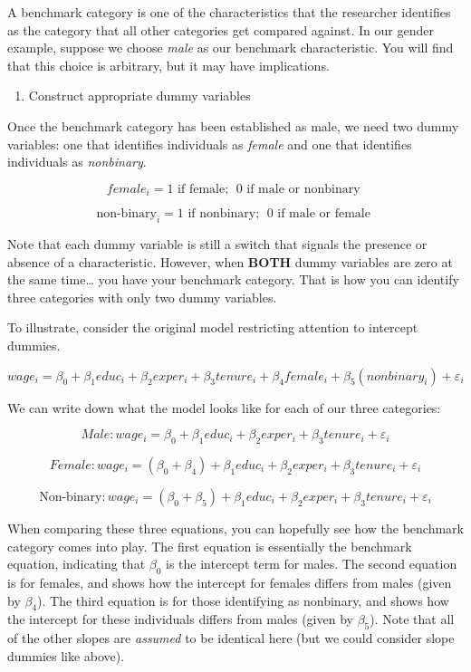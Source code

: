 \documentclass[
]{book}
\providecommand{\tightlist}{%
  \setlength{\itemsep}{0pt}\setlength{\parskip}{0pt}}
\begin{document}
A benchmark category is one of the characteristics that the researcher identifies as the category that all other categories get compared against. In our gender example, suppose we choose \emph{male} as our benchmark characteristic. You will find that this choice is arbitrary, but it may have implications.

\begin{enumerate}
\def\labelenumi{\arabic{enumi}.}
\setcounter{enumi}{1}
\tightlist
\item
  Construct appropriate dummy variables
\end{enumerate}

Once the benchmark category has been established as male, we need two dummy variables: one that identifies individuals as \emph{female} and one that identifies individuals as \emph{nonbinary}.

\[female_i = 1 \mbox{ if female; }\; 0 \mbox{ if male or nonbinary }\]

\[\mbox{non-binary}_i = 1 \mbox{ if nonbinary; }\;  0 \mbox{ if male or female }\]

Note that each dummy variable is still a switch that signals the presence or absence of a characteristic. However, when \textbf{BOTH} dummy variables are zero at the same time\ldots{} you have your benchmark category. That is how you can identify three categories with only two dummy variables.

To illustrate, consider the original model restricting attention to intercept dummies.

\[wage_i=\beta_0+\beta_1educ_i+\beta_2exper_i+\beta_3tenure_i+\beta_4female_i +\beta_5(nonbinary_i) +\varepsilon_i\]

We can write down what the model looks like for each of our three categories:

\[Male: wage_i=\beta_0+\beta_1educ_i+\beta_2exper_i+\beta_3tenure_i+\varepsilon_i\]

\[Female: wage_i=(\beta_0+\beta_4)+\beta_1educ_i+\beta_2exper_i+\beta_3tenure_i+\varepsilon_i\]

\[\mbox{Non-binary}: wage_i=(\beta_0+\beta_5)+\beta_1educ_i+\beta_2exper_i+\beta_3tenure_i+\varepsilon_i\]

When comparing these three equations, you can hopefully see how the benchmark category comes into play. The first equation is essentially the benchmark equation, indicating that \(\beta_0\) is the intercept term for males. The second equation is for females, and shows how the intercept for females differs from males (given by \(\beta_4\)). The third equation is for those identifying as nonbinary, and shows how the intercept for these individuals differs from males (given by \(\beta_5\)). Note that all of the other slopes are \emph{assumed} to be identical here (but we could consider slope dummies like above).
\end{document}

